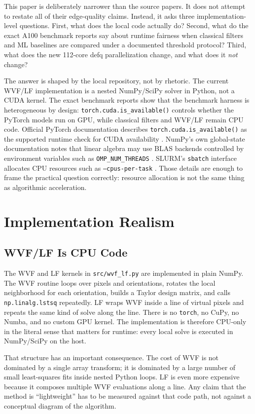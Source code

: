 \documentclass[conference]{IEEEtran}
\begin{document}
This paper is deliberately narrower than the source papers. It does not attempt to restate all of their edge-quality claims. Instead, it asks three implementation-level questions. First, what does the local code actually do? Second, what do the exact A100 benchmark reports say about runtime fairness when classical filters and ML baselines are compared under a documented threshold protocol? Third, what does the new 112-core defq parallelization change, and what does it \emph{not} change?

The answer is shaped by the local repository, not by rhetoric. The current WVF/LF implementation is a nested NumPy/SciPy solver in Python, not a CUDA kernel. The exact benchmark reports show that the benchmark harness is heterogeneous by design: \texttt{torch.cuda.is\_available()} controls whether the PyTorch models run on GPU, while classical filters and WVF/LF remain CPU code. Official PyTorch documentation describes \texttt{torch.cuda.is\_available()} as the supported runtime check for CUDA availability \cite{torchcuda}. NumPy's own global-state documentation notes that linear algebra may use BLAS backends controlled by environment variables such as \texttt{OMP\_NUM\_THREADS} \cite{numpyglobal}. SLURM's \texttt{sbatch} interface allocates CPU resources such as \texttt{--cpus-per-task} \cite{slurmsbatch}. Those details are enough to frame the practical question correctly: resource allocation is not the same thing as algorithmic acceleration.

\section{Implementation Realism}
\subsection{WVF/LF Is CPU Code}
The WVF and LF kernels in \texttt{src/wvf\_lf.py} are implemented in plain NumPy. The WVF routine loops over pixels and orientations, rotates the local neighborhood for each orientation, builds a Taylor design matrix, and calls \texttt{np.linalg.lstsq} repeatedly. LF wraps WVF inside a line of virtual pixels and repeats the same kind of solve along the line. There is no \texttt{torch}, no CuPy, no Numba, and no custom GPU kernel. The implementation is therefore CPU-only in the literal sense that matters for runtime: every local solve is executed in NumPy/SciPy on the host.

That structure has an important consequence. The cost of WVF is not dominated by a single array transform; it is dominated by a large number of small least-squares fits inside nested Python loops. LF is even more expensive because it composes multiple WVF evaluations along a line. Any claim that the method is ``lightweight'' has to be measured against that code path, not against a conceptual diagram of the algorithm.
\end{document}
